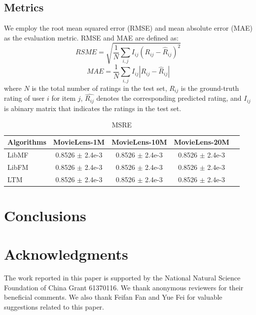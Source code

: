 \documentclass{sig-alternate-05-2015}
\begin{document}
\subsection{Metrics}
We employ the root mean squared error (RMSE) and mean absolute error (MAE) as the evaluation metric.
RMSE and MAE are defined as:
\begin{equation}
	RSME = \sqrt{ \frac{1}{N} \sum_{i,j} I_{ij} (R_{ij} - \hat{R}_{ij})^2 }
\end{equation}
\begin{equation}
	MAE = \frac{1}{N} \sum_{i,j} I_{ij} |R_{ij} - \hat{R}_{ij}|
\end{equation}
where $N$ is the total number of ratings in the test set,
$R_{ij}$ is the ground-truth rating of user $i$ for item $j$,
$\hat{R_{ij}}$ denotes the corresponding predicted rating,
and $I_{ij}$ is abinary matrix that indicates the ratings in the test set.




\begin{table}[htpb]
	\centering
	\caption{MSRE}
	\label{tab:msre}
	\begin{tabular}{|l|c|c|c|c|}
		\hline
		\textbf{Algorithms} & \textbf{MovieLens-1M} & \textbf{MovieLens-10M} & \textbf{MovieLens-20M} \\
		\hline
		LibMF & 0.8526 $\pm$ 2.4e-3 & 0.8526 $\pm$ 2.4e-3 & 0.8526 $\pm$ 2.4e-3 \\
		LibFM & 0.8526 $\pm$ 2.4e-3 & 0.8526 $\pm$ 2.4e-3 & 0.8526 $\pm$ 2.4e-3 \\
		LTM   & 0.8526 $\pm$ 2.4e-3 & 0.8526 $\pm$ 2.4e-3 & 0.8526 $\pm$ 2.4e-3 \\
		\hline
	\end{tabular}
\end{table}


\section{Conclusions}


\section{Acknowledgments}
The work reported in this paper is supported by the National Natural Science Foundation of China Grant 61370116.
We thank anonymous reviewers for their beneficial comments.
We also thank Feifan Fan and Yue Fei for valuable suggestions related to this paper.



\end{document}
